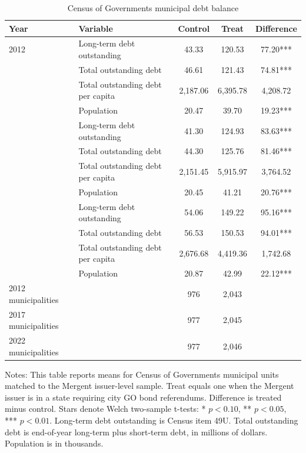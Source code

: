 \begin{table}[H]
\centering
\caption{Census of Governments municipal debt balance}
\begin{tabular*}{\textwidth}{@{\extracolsep{\fill}}llccc}
\toprule
Year & Variable & Control & Treat & Difference \\
\midrule
2012 & Long-term debt outstanding & 43.33 & 120.53 & 77.20*** \\
 & Total outstanding debt & 46.61 & 121.43 & 74.81*** \\
 & Total outstanding debt per capita & 2,187.06 & 6,395.78 & 4,208.72 \\
 & Population & 20.47 & 39.70 & 19.23*** \\
\addlinespace
2017 & Long-term debt outstanding & 41.30 & 124.93 & 83.63*** \\
 & Total outstanding debt & 44.30 & 125.76 & 81.46*** \\
 & Total outstanding debt per capita & 2,151.45 & 5,915.97 & 3,764.52 \\
 & Population & 20.45 & 41.21 & 20.76*** \\
\addlinespace
2022 & Long-term debt outstanding & 54.06 & 149.22 & 95.16*** \\
 & Total outstanding debt & 56.53 & 150.53 & 94.01*** \\
 & Total outstanding debt per capita & 2,676.68 & 4,419.36 & 1,742.68 \\
 & Population & 20.87 & 42.99 & 22.12*** \\
\midrule
2012 municipalities &  & 976 & 2,043 &  \\
2017 municipalities &  & 977 & 2,045 &  \\
2022 municipalities &  & 977 & 2,046 &  \\
\bottomrule
\end{tabular*}
\begin{minipage}{\textwidth}
\footnotesize Notes: This table reports means for Census of Governments municipal units matched to the Mergent issuer-level sample. Treat equals one when the Mergent issuer is in a state requiring city GO bond referendums. Difference is treated minus control. Stars denote Welch two-sample t-tests: * $p<0.10$, ** $p<0.05$, *** $p<0.01$. Long-term debt outstanding is Census item 49U. Total outstanding debt is end-of-year long-term plus short-term debt, in millions of dollars. Population is in thousands.
\end{minipage}
\end{table}
